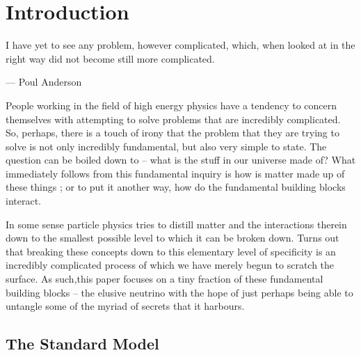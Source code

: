 \section{Introduction}

I have yet to see any problem, however complicated, which, when looked at in the right way did not become still more complicated.

\begin{flushright}--- Poul Anderson\end{flushright}

  People working in the field of high energy physics have a tendency to concern themselves with attempting to solve problems that are incredibly complicated.
  So, perhaps, there is a touch of irony that the problem that they are trying to solve is not only incredibly fundamental, but also very simple to state.
  The question can be boiled down to -- what is the stuff in our universe made of?
  What immediately follows from this fundamental inquiry is how is matter made up of these things ; or to put it another way, how do the fundamental building blocks interact.

  In some sense particle physics tries to distill matter and the interactions therein down to the smallest possible level to which it can be broken down.
  Turns out that breaking these concepts down to this elementary level of specificity is an incredibly complicated process of which we have merely begun to scratch the surface.
  As such,this paper focuses on a tiny fraction of these fundamental building blocks -- the elusive neutrino with the hope of just perhaps being able to untangle some of the myriad of secrets that it harbours.

  \subsection{The Standard Model}




